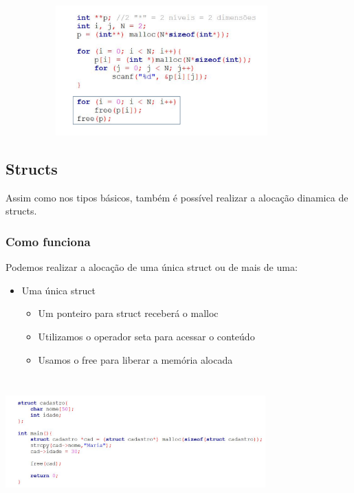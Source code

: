 \documentclass{report}
\begin{document}
	\begin{center}
		
		\includegraphics[width=12cm,height=5cm,keepaspectratio=false]{imagens/freepointpoint.png}
		
	\end{center}
	
	
	
	\subsection{Structs}
	
	Assim como nos tipos básicos, também é possível realizar a alocação dinamica de structs.
	
	\subsubsection{Como funciona}
	
	Podemos realizar a alocação de uma única struct ou de mais de uma:
	
	\begin{itemize}
		\item Uma única struct
		\begin{itemize}
			\item Um ponteiro para struct receberá o malloc
			\item Utilizamos o operador seta para acessar o conteúdo
			\item Usamos o free para liberar a memória alocada
		\end{itemize}
	\end{itemize}
	
	
	\begin{center}
	
		\includegraphics[width=10cm,height=5cm,keepaspectratio=false]{imagens/alocstruct1.png}
	
	\end{center}
	
\end{document}
